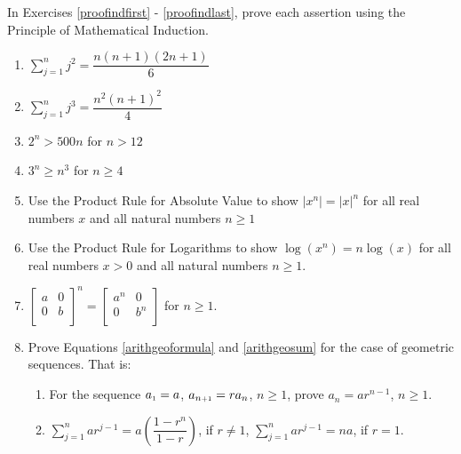 In Exercises \ref{proofindfirst} - \ref{proofindlast}, prove each assertion using the Principle of Mathematical Induction.

\begin{enumerate}

\item  $\displaystyle{ \sum_{j=1}^{n} j^2 = \dfrac{n(n+1)(2n+1)}{6}}$ \label{proofindfirst}

\item  $\displaystyle{ \sum_{j=1}^{n} j^3 = \dfrac{n^2(n+1)^2}{4}}$

\item  $2^{n} > 500 n$ for $n > 12$

\item  $3^{n} \geq n^3$ for $n \geq 4$

\item  Use the Product Rule for Absolute Value to show  $\left|x^{n}\right| = |x|^{n}$ for all real numbers $x$ and all natural numbers $n \geq 1$

\item  Use the Product Rule for Logarithms to show $\log\left(x^{n}\right) = n \log(x)$ for all real numbers $x > 0$ and all natural numbers $n \geq 1$.

\item  $\left[ \begin{array}{cc} a & 0 \\ 0 & b \\ \end{array} \right]^{n} = \left[ \begin{array}{cc} a^{n} & 0 \\ 0 & b^{n} \\ \end{array} \right]$ for $n \geq 1$. \label{proofindlast}


\item  Prove Equations \ref{arithgeoformula} and \ref{arithgeosum} for the case of geometric sequences.  That is:

\begin{enumerate}

\item \label{proofgeosequeneex} For the sequence  $a_{\mbox{\tiny $1$}} = a$, $a_{n\mbox{\tiny{$+1$}}} = r a_{n}$, $n \geq 1$, prove $a_{n} = ar^{n-1}$, $n \geq 1$.

\item  \label{proofgeosumex} $\displaystyle{\sum_{j=1}^{n} a r^{j-1} = a \left( \dfrac{1-r^n}{1-r}\right)}$, if $r \neq 1$, $\displaystyle{\sum_{j=1}^{n} a r^{j-1} = na}$, if $r=1$.


\end{enumerate}
\end{enumerate}
